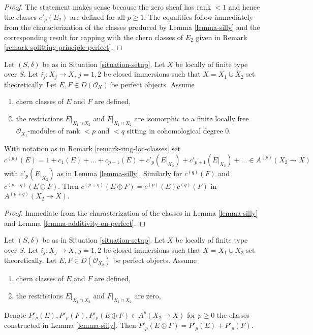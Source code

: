 \begin{proof}
The statement makes sense because the zero sheaf has rank $< 1$ and
hence the classes $c'_p(E_2)$ are defined for all $p \geq 1$. The equalities
follow immediately from the characterization of the classes produced
by Lemma \ref{lemma-silly} and the corresponding result for
capping with the chern classes of $E_2$ given in
Remark \ref{remark-splitting-principle-perfect}.
\end{proof}

\begin{lemma}
\label{lemma-silly-sum-c}
Let $(S, \delta)$ be as in Situation \ref{situation-setup}. Let $X$ be
locally of finite type over $S$. Let $i_j : X_j \to X$, $j = 1, 2$
be closed immersions such that $X = X_1 \cup X_2$ set theoretically. Let
$E, F \in D(\mathcal{O}_X)$ be perfect objects. Assume
\begin{enumerate}
\item chern classes of $E$ and $F$ are defined,
\item the restrictions $E|_{X_1 \cap X_2}$ and $F|_{X_1 \cap X_2}$
are isomorphic to a finite locally free $\mathcal{O}_{X_1}$-modules
of rank $< p$ and $< q$ sitting in cohomological degree $0$.
\end{enumerate}
With notation as in Remark \ref{remark-ring-loc-classes} set
$$
c^{(p)}(E) = 1 + c_1(E) + \ldots + c_{p - 1}(E) +
c'_p(E|_{X_2}) + c'_{p + 1}(E|_{X_2}) + \ldots \in A^{(p)}(X_2 \to X)
$$
with $c'_p(E|_{X_2})$ as in Lemma \ref{lemma-silly}. Similarly
for $c^{(q)}(F)$ and $c^{(p + q)}(E \oplus F)$.
Then $c^{(p + q)}(E \oplus F) = c^{(p)}(E)c^{(q)}(F)$
in $A^{(p + q)}(X_2 \to X)$.
\end{lemma}

\begin{proof}
Immediate from the characterization of the classes in
Lemma \ref{lemma-silly} and Lemma \ref{lemma-additivity-on-perfect}.
\end{proof}

\begin{lemma}
\label{lemma-silly-sum-P}
Let $(S, \delta)$ be as in Situation \ref{situation-setup}. Let $X$ be
locally of finite type over $S$. Let $i_j : X_j \to X$, $j = 1, 2$
be closed immersions such that $X = X_1 \cup X_2$ set theoretically. Let
$E, F \in D(\mathcal{O}_{X_2})$ be perfect objects. Assume
\begin{enumerate}
\item chern classes of $E$ and $F$ are defined,
\item the restrictions $E|_{X_1 \cap X_2}$ and $F|_{X_1 \cap X_2}$ are zero,
\end{enumerate}
Denote $P'_p(E), P'_p(F), P'_p(E \oplus F) \in A^p(X_2 \to X)$ for $p \geq 0$
the classes constructed in Lemma \ref{lemma-silly}. Then
$P'_p(E \oplus F) = P'_p(E) + P'_p(F)$.
\end{lemma}


